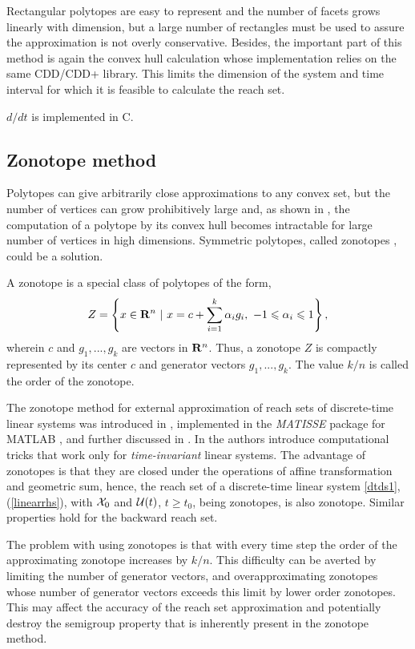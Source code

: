 Rectangular polytopes are easy to represent and the number
of facets grows linearly with dimension, but a large number of rectangles
must be used to assure the approximation is not overly conservative.
Besides, the important part of this method is again the convex hull
calculation whose implementation relies on the same CDD/CDD+
library. This limits the dimension of the system and time interval
for which it is feasible to calculate the reach set.

$d/dt$ is implemented in C.













\subsection{Zonotope method}\label{subsec_zonotopes}
Polytopes can give arbitrarily close approximations to any convex set, but
the number of vertices can grow prohibitively large and, as
shown in \cite{avis}, the computation of a polytope by its convex hull becomes
intractable for large number of vertices in high dimensions.
Symmetric polytopes, called zonotopes \cite{zonotool}, could be a solution.

\bd[Zonotope]
A zonotope is a special class of polytopes of the form,
\[Z=\left\{x \in {\bf R}^n ~|~
x=c+\sum_{i=1}^k\alpha_ig_i,~ -1\leq\alpha_i\leq1\right\},\]
wherein $c$ and $g_1, ..., g_k$ are vectors in ${\bf R}^n$.
\label{def_zonotope}
\ed
Thus, a zonotope $Z$ is compactly represented by its center $c$ and
generator vectors $g_1, ..., g_k$.
The value $k/n$ is called the order of the zonotope.

The zonotope method for external approximation of reach sets of
discrete-time linear systems was introduced in \cite{girard05},
implemented in the \emph{MATISSE} package for MATLAB \cite{matisse},
and further discussed in \cite{girard06}.
In \cite{girard06} the authors introduce computational tricks that
work only for \emph{time-invariant} linear systems.
The advantage of zonotopes is that they are closed under the operations
of affine transformation and geometric sum, hence, the reach set
of a discrete-time linear system \ref{dtds1}, (\ref{linearrhs}), with
$\XX_0$ and $\UU(t)$, $t\geq t_0$, being zonotopes, is also zonotope.
Similar properties hold for the backward reach set.

The problem with using zonotopes is that with every time step the order of
the approximating zonotope increases by $k/n$.
This difficulty can be averted by limiting the number of generator vectors,
and overapproximating zonotopes whose number of generator vectors exceeds
this limit by lower order zonotopes.
This may affect the accuracy of the reach set approximation and
potentially destroy the semigroup property that is inherently present
in the zonotope method.

